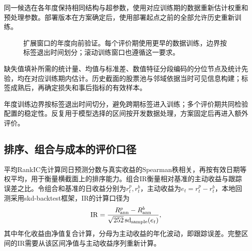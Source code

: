\documentclass[UTF8,11pt,a4paper,fontset=fandol]{ctexart}
\newenvironment{methodfigure}{\begin{figure}[!htbp]}{\end{figure}}
\begin{document}
同一候选在各年度保持相同结构与超参数，使用对应训练期的数据重新估计权重和预处理参数。部署版本在方案确定后，使用部署起点之前的全部允许历史重新训练。

\begin{methodfigure}\centering
{}
\caption{扩展窗口的年度向前验证。每个评价期使用更早的数据训练，边界按标签退出时间划分；滚动训练窗口也遵循这一要求。}\label{fig:time}
\end{methodfigure}

缺失值填补所需的统计量、均值与标准差、数值特征分段编码的分位节点及统计先验，均在对应训练期内估计。历史截面的股票池与邻域依据当时可见信息构建；标签成熟后，再确定损失和事后指标的有效样本。

年度训练边界按标签退出时间切分，避免跨期标签进入训练；多个评价期共同检验配置的稳定性。反复用于模型选择的区间按开发数据处理，方案固定后再进入额外评价。

\subsection{排序、组合与成本的评价口径}\label{sec:metrics}
平均RankIC先计算同日预测分数与真实收益的Spearman秩相关，再按有效日期等权平均，用于衡量横截面上的排序能力。组合IR衡量相对基准的主动收益与跟踪误差之比。令组合和基准的日收益分别为$r^p_t,r^b_t$，主动收益为$e_t=r^p_t-r^b_t$，本地回测采用skd-backtest框架\cite{skdbacktest}，IR的计算口径为
\begin{equation}
 \operatorname{IR}=\frac{R^p_{\rm ann}-R^b_{\rm ann}}{\sqrt{252}\operatorname{sd}_{\rm sample}(e_t)},
 \label{eq:ir}
\end{equation}
其中年化收益由净值复合计算，分母为主动收益的年化波动，即跟踪误差。完整区间的IR需要从该区间净值与主动收益序列重新计算。
\end{document}
